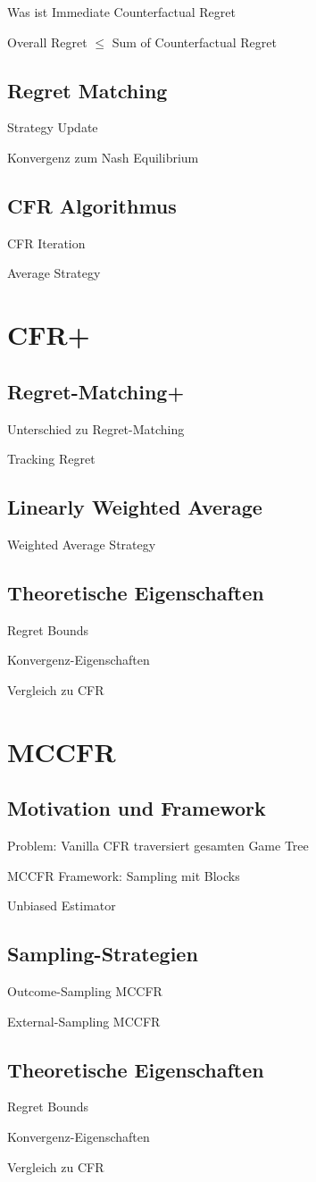 Was ist Immediate Counterfactual Regret

Overall Regret $\leq$ Sum of Counterfactual Regret

\subsection{Regret Matching}
Strategy Update

Konvergenz zum Nash Equilibrium

\subsection{CFR Algorithmus}
CFR Iteration

Average Strategy

\section{CFR+}

\subsection{Regret-Matching+}
Unterschied zu Regret-Matching

Tracking Regret

\subsection{Linearly Weighted Average}
Weighted Average Strategy

\subsection{Theoretische Eigenschaften}
Regret Bounds

Konvergenz-Eigenschaften

Vergleich zu CFR

\section{MCCFR}

\subsection{Motivation und Framework}
Problem: Vanilla CFR traversiert gesamten Game Tree

MCCFR Framework: Sampling mit Blocks

Unbiased Estimator

\subsection{Sampling-Strategien}
Outcome-Sampling MCCFR

External-Sampling MCCFR

\subsection{Theoretische Eigenschaften}
Regret Bounds

Konvergenz-Eigenschaften

Vergleich zu CFR
